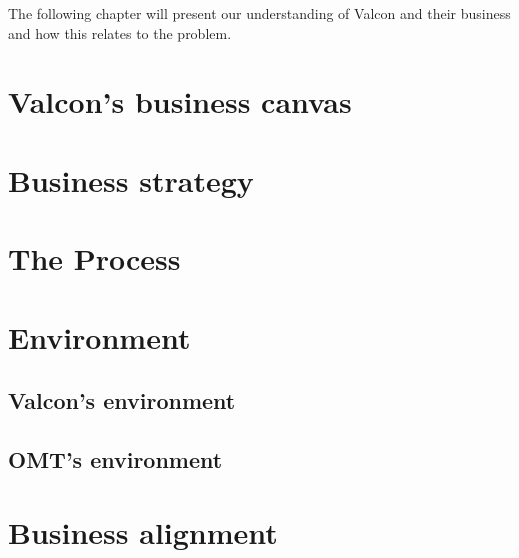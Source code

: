 The following chapter will present our understanding of Valcon and their business and how this relates to the problem.

\section{Valcon's business canvas}

\section{Business strategy}

\section{The Process}

\section{Environment}
\subsection{Valcon's environment}

\subsection{OMT's environment}

\section{Business alignment}
